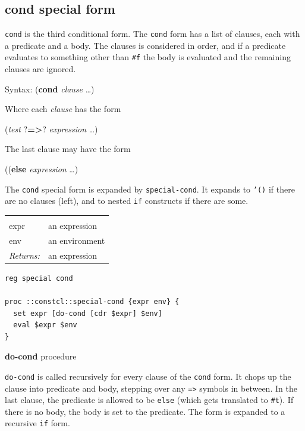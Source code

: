 \documentclass[twoside,9pt]{report}
\begin{document}
\subsection{cond special form}
\label{cond-special-form}


\texttt{cond} is the third conditional form. The \texttt{cond} form has a list of clauses, each with a predicate and a body. The clauses is considered in order, and if a predicate evaluates to something other than \texttt{\#f} the body is evaluated and the remaining clauses are ignored.



Syntax: (\textbf{cond} \emph{clause} \ldots )


Where each \emph{clause} has the form


(\emph{test} ?\textbf{=>}? \emph{expression} \ldots )


The last clause may have the form


((\textbf{else} \emph{expression} \ldots )


The \texttt{cond} special form is expanded by \texttt{special-cond}. It expands to \texttt{'()} if there are no clauses (left), and to nested \texttt{if} constructs if there are some.

\noindent\begin{tabular}{ |p{1.9cm} p{8cm}| }
\hline
\rowcolor[HTML]{CCCCCC} \multicolumn{2}{|l|}{\bf special-cond (internal)} \\
expr & an expression \\
env & an environment \\
\textit{Returns:} & an expression \\
\hline
\end{tabular}
\begin{lstlisting}
reg special cond

proc ::constcl::special-cond {expr env} {
  set expr [do-cond [cdr $expr] $env]
  eval $expr $env
}
\end{lstlisting}


\textbf{do-cond} procedure


\texttt{do-cond} is called recursively for every clause of the \texttt{cond} form. It chops up the clause into predicate and body, stepping over any \texttt{=>} symbols in between. In the last clause, the predicate is allowed to be \texttt{else} (which gets translated to \texttt{\#t}). If there is no body, the body is set to the predicate. The form is expanded to a recursive \texttt{if} form.
\end{document}
